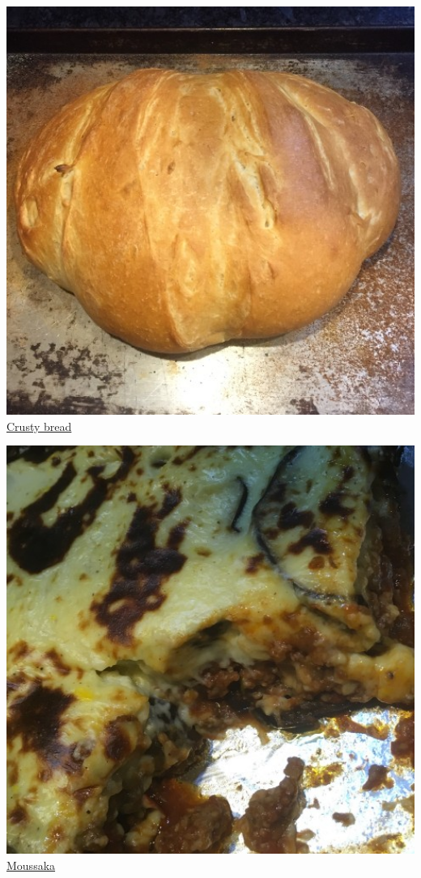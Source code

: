\documentclass[
]{book}
\begin{document}
\protect\hyperlink{crustybread}{\includegraphics[width=1\textwidth,height=\textheight]{crusty_bread_small.jpg}}
\protect\hyperlink{crustybread}{Crusty bread}

\protect\hyperlink{moussaka}{\includegraphics[width=1\textwidth,height=\textheight]{moussaka_small.jpg}}
\protect\hyperlink{moussaka}{Moussaka}
\end{document}
